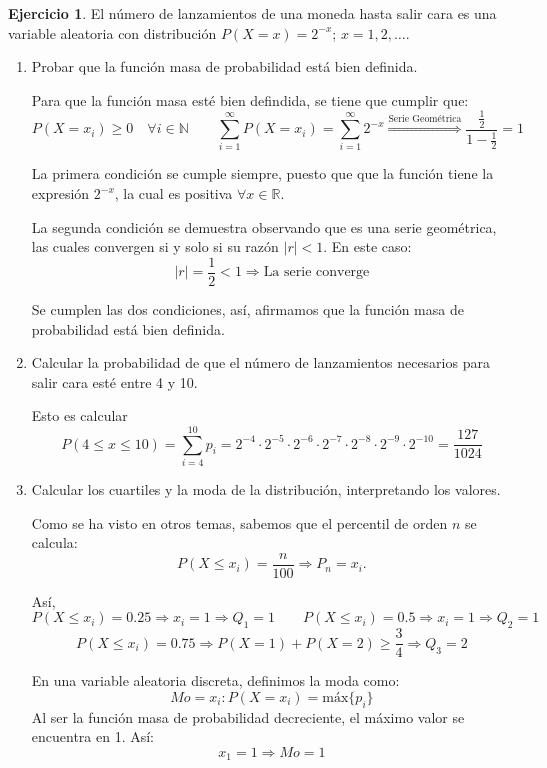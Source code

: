 \documentclass[a4paper, 12pt]{article}
\theoremstyle{definition}
\newtheorem{ej}{Ejercicio}
\begin{document}
\begin{ej}
El número de lanzamientos de una moneda hasta salir cara es una variable aleatoria con distribución \(P(X=x) = 2^{-x}\); \(x=1,2,\dotsc\).

\begin{enumerate}[label=\textit{\alph*)}]
	\item Probar que la función masa de probabilidad está bien definida.
	
Para que la función masa esté bien defindida, se tiene que cumplir que:
\[
	P(X=x_i) \geq 0 \quad \forall i \in \mathbb{N} \qquad \sum_{i=1}^{\infty} P(X=x_i) = \sum_{i=1}^{\infty} 2^{-x} \overset{\text{Serie Geométrica}}{\Rightarrow} \frac{\frac{1}{2}}{1-\frac{1}{2}} = 1
\]

La primera condición se cumple siempre, puesto que que la función tiene la expresión \(2^{-x}\), la cual es positiva \(\forall x \in \mathbb{R}\).

La segunda condición se demuestra observando que es una serie geométrica, las cuales convergen si y solo si su razón \(|r| < 1\). En este caso:
\[
	|r| = \frac{1}{2} < 1 \Rightarrow \text{La serie converge}
\]

Se cumplen las dos condiciones, así, afirmamos que la función masa de probabilidad está bien definida.

	\item Calcular la probabilidad de que el número de lanzamientos necesarios para salir cara esté entre 4 y 10.
	
Esto es calcular
\[
	P(4 \leq x \leq 10) = \sum_{i=4}^{10}p_i = 2^{-4} \cdot 2^{-5} \cdot 2^{-6} \cdot 2^{-7} \cdot 2^{-8} \cdot 2^{-9} \cdot 2^{-10} = \frac{127}{1024}
\]

	\item Calcular los cuartiles y la moda de la distribución, interpretando los valores.
	
Como se ha visto en otros temas, sabemos que el percentil de orden \(n\) se calcula:
\[
	P(X \leq x_i) = \frac{n}{100} \Rightarrow P_n = x_i.
\]

Así, 
\[
	P(X \leq x_i) = 0.25 \Rightarrow x_i = 1 \Rightarrow Q_1 = 1 \qquad P(X \leq x_i) = 0.5 \Rightarrow x_i = 1 \Rightarrow Q_2 = 1
\]
\[
	P(X \leq x_i) = 0.75 \Rightarrow P(X=1) + P(X=2) \geq \frac{3}{4} \Rightarrow Q_3 = 2
\]

En una variable aleatoria discreta, definimos la moda como:
\[
	Mo = x_i : P(X=x_i) = \text{máx} \{p_i\}
\]
Al ser la función masa de probabilidad decreciente, el máximo valor se encuentra en 1. Así:
\[
	x_1 = 1 \Rightarrow Mo = 1
\]


\end{enumerate}
\end{ej}
\end{document}
